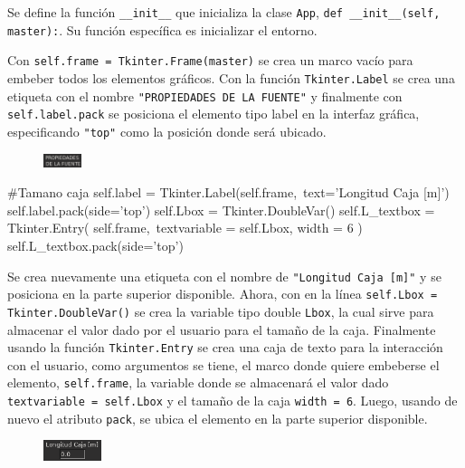 Se define la función \texttt{\_\_init\_\_} que inicializa la clase 
\texttt{App}, \texttt{def \_\_init\_\_(self, master):}. Su función 
específica es inicializar el entorno.


Con \texttt{self.frame = Tkinter.Frame(master)} se crea un marco vacío
para embeber todos los elementos gráficos. Con la función 
\texttt{Tkinter.Label} se crea una etiqueta con el nombre \texttt{"PROPIEDADES
DE LA FUENTE"} y finalmente con \texttt{self.label.pack} se posiciona el
elemento tipo label en la interfaz gráfica, especificando \texttt{"top"}
como la posición donde será ubicado.

\begin{figure}[htbp]
	\centering
	\includegraphics[width=0.10\textwidth]
	{./pictures/environment_label1.png}
	\label{fig:env_label1}
\end{figure}


\begin{listing}[style=python, numbers = none]
    #Tamano caja
    self.label = Tkinter.Label(self.frame,\
    text='Longitud Caja [m]')
    self.label.pack(side='top') 
    self.Lbox = Tkinter.DoubleVar()
    self.L_textbox = Tkinter.Entry( self.frame,\
    textvariable = self.Lbox, width = 6 )
    self.L_textbox.pack(side='top')
\end{listing}
Se crea nuevamente una etiqueta con el nombre de \texttt{"Longitud Caja [m]"}
y se posiciona en la parte superior disponible. Ahora, con en la línea
\texttt{self.Lbox = Tkinter.DoubleVar()} se crea la variable tipo double 
\texttt{Lbox}, la cual sirve para almacenar el valor dado por el usuario 
para el tamaño de la caja. Finalmente usando la función \texttt{Tkinter.Entry}
se crea una caja de texto para la interacción con el usuario, como 
argumentos se tiene, el marco donde quiere embeberse el elemento, 
\texttt{self.frame}, la variable donde se almacenará el valor dado 
\texttt{textvariable = self.Lbox} y el tamaño de la caja \texttt{width = 6}.
Luego, usando de nuevo el atributo \texttt{pack}, se ubica el elemento en
la parte superior disponible.

\begin{figure}[htbp]
	\centering
	\includegraphics[width=0.15\textwidth]
	{./pictures/environment_Lbox.png}
	\label{fig:env_Lbox}
\end{figure}


